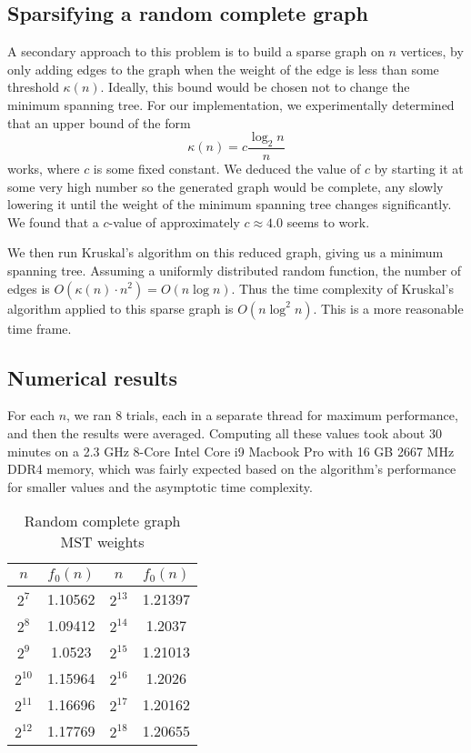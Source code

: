 \documentclass[a4paper, 10pt, twocolumn, twoside]{article}
\begin{document}
\subsection{Sparsifying a random complete graph}

A secondary approach to this problem is to build a sparse graph on $n$ vertices, by only adding edges to the graph when the weight of the edge is less than some threshold $\kappa(n)$. Ideally, this bound would be chosen not to change the minimum spanning tree. For our implementation, we experimentally determined that an upper bound of the form
\[
    \kappa(n)=c\frac{\log_2 n}{n}
\]
works, where $c$ is some fixed constant. We deduced the value of $c$ by starting it at some very high number so the generated graph would be complete, any slowly lowering it until the weight of the minimum spanning tree changes significantly. We found that a $c$-value of approximately $c\approx 4.0$ seems to work.

We then run Kruskal's algorithm on this reduced graph, giving us a minimum spanning tree. Assuming a uniformly distributed random function, the number of edges is $O(\kappa(n)\cdot n^2)=O(n\log n)$. Thus the time complexity of Kruskal's algorithm applied to this sparse graph is $O(n\log^2 n)$. This is a more reasonable time frame. 

\subsection{Numerical results}

For each $n$, we ran $8$ trials, each in a separate thread for maximum performance, and then the results were averaged. Computing all these values took about 30 minutes on a 2.3 GHz 8-Core Intel Core i9 Macbook Pro
with 16 GB 2667 MHz DDR4 memory, which was fairly expected based on the algorithm's performance for smaller values and the asymptotic time complexity.

\renewcommand{\arraystretch}{1.5}
\begin{table}[htbp]
\centering
\caption{Random complete graph MST weights}
\begin{tabular}{||c|c||c|c||}
\hline
$n$ & $f_0(n)$ & $n$ & $f_0(n)$ \\
\hline
$2^7$ &1.10562 & $2^{13}$  &1.21397\\
$2^8$	&1.09412 & $2^{14}$  &1.2037\\
$2^9$&1.0523 &$2^{15}$  &1.21013\\
$2^{10}$ &1.15964 &$2^{16}$  &1.2026\\
$2^{11}$  &1.16696 & $2^{17}$  &1.20162\\
$2^{12}$  &1.17769 & $2^{18}$  &1.20655\\
\hline
\end{tabular}
\end{table}
\end{document}
